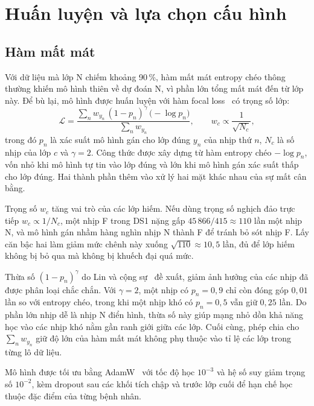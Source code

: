 \section{Huấn luyện và lựa chọn cấu hình}\label{sec:huanluyen}

\subsection{Hàm mất mát}

Với dữ liệu mà lớp N chiếm khoảng 90\,\%, hàm mất mát entropy chéo thông thường khiến mô hình thiên về dự đoán N, vì phần lớn tổng mất mát đến từ lớp này.
Để bù lại, mô hình được huấn luyện với hàm focal loss~\cite{lin2017focal} có trọng số lớp:
\begin{equation}
  \mathcal{L}=\frac{\sum_{n}w_{y_n}\,(1-p_{n})^{\gamma}\,\big(-\log p_{n}\big)}{\sum_{n}w_{y_n}},\qquad
  w_c\propto\frac{1}{\sqrt{N_c}},
  \label{eq:ch4-focal}
\end{equation}
trong đó $p_n$ là xác suất mô hình gán cho lớp đúng $y_n$ của nhịp thứ $n$, $N_c$ là số nhịp của lớp $c$ và $\gamma=2$.
Công thức được xây dựng từ hàm entropy chéo $-\log p_n$, vốn nhỏ khi mô hình tự tin vào lớp đúng và lớn khi mô hình gán xác suất thấp cho lớp đúng.
Hai thành phần thêm vào xử lý hai mặt khác nhau của sự mất cân bằng.

Trọng số $w_c$ tăng vai trò của các lớp hiếm.
Nếu dùng trọng số nghịch đảo trực tiếp $w_c\propto1/N_c$, một nhịp F trong DS1 nặng gấp $45\,866/415\approx110$ lần một nhịp N, và mô hình gán nhầm hàng nghìn nhịp N thành F để tránh bỏ sót nhịp F.
Lấy căn bậc hai làm giảm mức chênh này xuống $\sqrt{110}\approx10{,}5$ lần, đủ để lớp hiếm không bị bỏ qua mà không bị khuếch đại quá mức.

Thừa số $(1-p_n)^{\gamma}$ do Lin và cộng sự~\cite{lin2017focal} đề xuất, giảm ảnh hưởng của các nhịp đã được phân loại chắc chắn.
Với $\gamma=2$, một nhịp có $p_n=0{,}9$ chỉ còn đóng góp $0{,}01$ lần so với entropy chéo, trong khi một nhịp khó có $p_n=0{,}5$ vẫn giữ $0{,}25$ lần.
Do phần lớn nhịp dễ là nhịp N điển hình, thừa số này giúp mạng nhỏ dồn khả năng học vào các nhịp khó nằm gần ranh giới giữa các lớp.
Cuối cùng, phép chia cho $\sum_n w_{y_n}$ giữ độ lớn của hàm mất mát không phụ thuộc vào tỉ lệ các lớp trong từng lô dữ liệu.

Mô hình được tối ưu bằng AdamW~\cite{loshchilov2019decoupled} với tốc độ học $10^{-3}$ và hệ số suy giảm trọng số $10^{-2}$, kèm dropout sau các khối tích chập và trước lớp cuối để hạn chế học thuộc đặc điểm của từng bệnh nhân.

